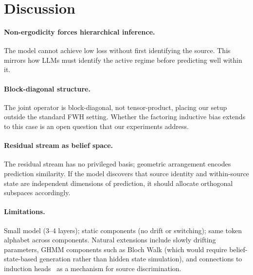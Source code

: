\section{Discussion}

\paragraph{Non-ergodicity forces hierarchical inference.} The model cannot achieve low loss without first identifying the source. This mirrors how LLMs must identify the active regime before predicting well within it.

\paragraph{Block-diagonal structure.} The joint operator is block-diagonal, not tensor-product, placing our setup outside the standard FWH setting. Whether the factoring inductive bias extends to this case is an open question that our experiments address.

\paragraph{Residual stream as belief space.} The residual stream has no privileged basis; geometric arrangement encodes prediction similarity. If the model discovers that source identity and within-source state are independent dimensions of prediction, it should allocate orthogonal subspaces accordingly.

\paragraph{Limitations.} Small model (3--4 layers); static components (no drift or switching); same token alphabet across components. Natural extensions include slowly drifting parameters, GHMM components such as Bloch Walk (which would require belief-state-based generation rather than hidden state simulation), and connections to induction heads~\cite{olsson2022context} as a mechanism for source discrimination.
